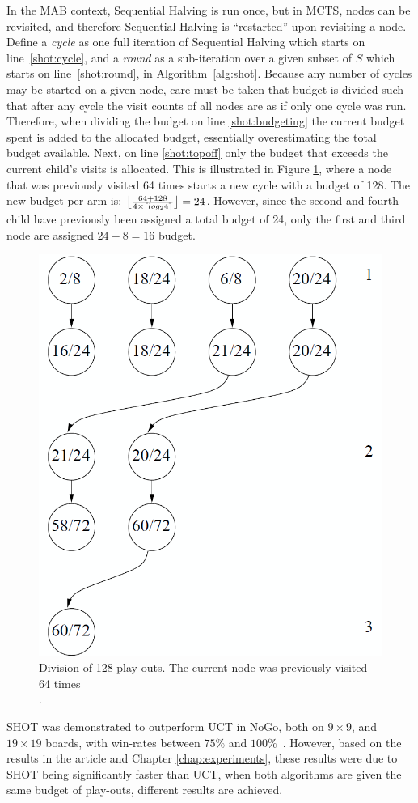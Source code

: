 \documentclass{icga}
\DeclarePairedDelimiter{\ceil}{\lceil}{\rceil}
\DeclarePairedDelimiter{\floor}{\lfloor}{\rfloor}
\begin{document}
In the MAB context, Sequential Halving is run once, but in MCTS, nodes can be revisited, and therefore Sequential Halving is ``restarted'' upon revisiting a node. Define a \emph{cycle} as one full iteration of Sequential Halving which starts on line~\ref{shot:cycle}, and a \emph{round} as a sub-iteration over a given subset of $S$ which starts on line~\ref{shot:round}, in Algorithm~\ref{alg:shot}. Because any number of cycles may be started on a given node, care must be taken that budget is divided such that after any cycle the visit counts of all nodes are as if only one cycle was run. Therefore, when dividing the budget on line \ref{shot:budgeting} the current budget spent is added to the allocated budget, essentially overestimating the total budget available. Next, on line \ref{shot:topoff} only the budget that exceeds the current child's visits is allocated. This is illustrated in Figure \ref{fig:shot-topoffs}, where a node that was previously visited 64 times starts a new cycle with a budget of 128. The new budget per arm is: $\floor[\big]{\frac{64 + 128}{4\times\ceil{log_2{4}}}} = 24$. However, since the second and fourth child have previously been assigned a total budget of 24, only the first and third node are assigned $24-8=16$ budget.

\begin{figure}[h]
	\centering
	\includegraphics[width=.3\textwidth]{img/shot_topoffs.png}
	\caption[SHOT budget division example]{Division of 128 play-outs. The current node was previously visited 64 times \\ \protect{}.}
	\label{fig:shot-topoffs}
\end{figure}

SHOT was demonstrated to outperform UCT in NoGo, both on $9\times9$, and $19\times19$ boards, with win-rates between $75\%$ and $100\%$~. However, based on the results in the article and Chapter \ref{chap:experiments}, these results were due to SHOT being significantly faster than UCT, when both algorithms are given the same budget of play-outs, different results are achieved.
\end{document}
